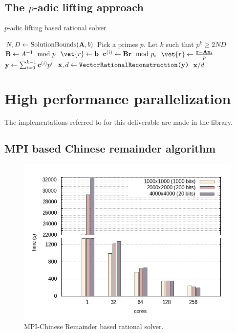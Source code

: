 \subsection{The $p$-adic lifting approach}

\begin{algorithm}
  \caption{$p$-adic lifting based rational solver}
  \begin{algorithmic}[1]
    \State $N,D \leftarrow \text{SolutionBounds}(\mathbf{A},b)$
    \State Pick a  primes $p$. Let $k$ such that $p^k \geq 2ND$
    \State $\mathbf{B}\leftarrow A^{-1} \mod p$
    \State $\vet{r}\leftarrow \vect{b}$
    \State $\mathbf{c}^{(i)}  \leftarrow \mathbf{B} \mathbf{r} \mod p_i$
    \State $\vet{r} \leftarrow  \frac{\vect{r} - \mat{A}\vect{x_i}}{p}$
    \EndFor
    \State $\mathbf{y} \leftarrow \sum_{i=0}^{k-1} \mathbf{c}^{(i)} p^i$
    \State $\mathbf{x},d\leftarrow \texttt{VectorRationalReconstruction(\ensuremath{\mathbf{y}})}$
  \State \Return $\mathbf{x}/d$
\end{algorithmic}
\end{algorithm}

\section{High performance parallelization}

The implementations referred to for this deliverable are made in the \Linbox library.


\subsection{MPI based Chinese remainder algorithm}
\begin{figure}[htb]
\begin{center}
  \includegraphics[width=.7\textwidth]{nodes_histogram}
\end{center}
\caption{MPI-Chinese Remainder based rational solver.}\label{fig:mpi_histo}
\end{figure}
